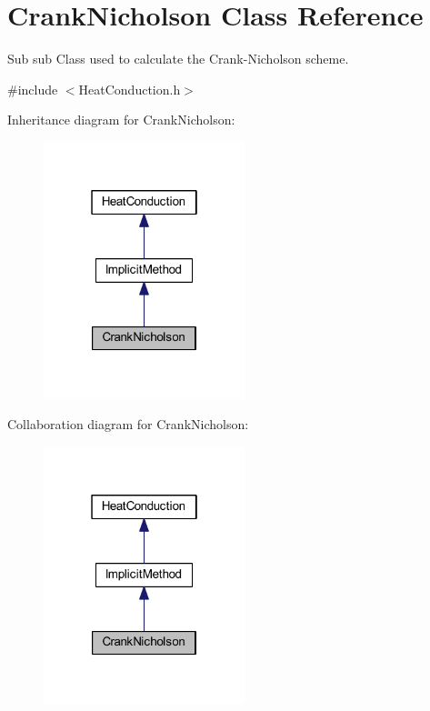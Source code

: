 \hypertarget{class_crank_nicholson}{}\section{Crank\+Nicholson Class Reference}
\label{class_crank_nicholson}


Sub sub Class used to calculate the Crank-\/\+Nicholson scheme.  




{\ttfamily \#include $<$Heat\+Conduction.\+h$>$}



Inheritance diagram for Crank\+Nicholson\+:\nopagebreak
\begin{figure}[H]
\begin{center}
\leavevmode
\includegraphics[width=166pt]{class_crank_nicholson__inherit__graph}
\end{center}
\end{figure}


Collaboration diagram for Crank\+Nicholson\+:\nopagebreak
\begin{figure}[H]
\begin{center}
\leavevmode
\includegraphics[width=166pt]{class_crank_nicholson__coll__graph}
\end{center}
\end{figure}
